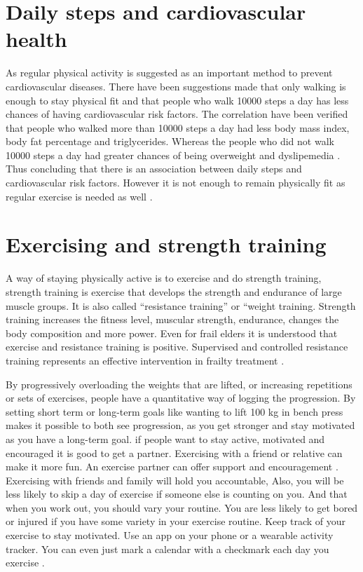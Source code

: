\section{Daily steps and cardiovascular health}
As regular physical activity is suggested as an important method to prevent cardiovascular diseases. There have been suggestions made that only walking is enough to stay physical fit and that people who walk 10000 steps a day has less chances of having cardiovascular risk factors. The correlation have been verified that people who walked more than 10000 steps a day had less body mass index, body fat percentage and triglycerides. Whereas the people who did not walk 10000 steps a day had greater chances of being overweight and dyslipemedia \cite{Rodrigues}. Thus concluding that there is an association between daily steps and cardiovascular risk factors. However it is not enough to remain physically fit as regular exercise is needed as well \cite{WHO}.

\section{Exercising and strength training}
A way of staying physically active is to exercise and do strength training, strength training is exercise that develops the strength and endurance of large muscle groups. It is also called “resistance training” or “weight training\cite{Resistance}. Strength training increases the fitness level, muscular strength, endurance, changes the body composition and more power. Even for frail elders it is understood that exercise and resistance training is positive. Supervised and controlled resistance training represents an effective intervention in frailty treatment \cite{Lopesz}.

By progressively overloading the weights that are lifted, or increasing repetitions or sets of exercises, people have a quantitative way of logging the progression. By setting short term or long-term goals like wanting to lift 100 kg in bench press makes it possible to both see progression, as you get stronger and stay motivated as you have a long-term goal.
if people want to stay active, motivated and encouraged it is good to get a partner. Exercising with a friend or relative can make it more fun. An exercise partner can offer support and encouragement \cite{FriendWorkout}. Exercising with friends and family will hold you accountable, Also, you will be less likely to skip a day of exercise if someone else is counting on you. And that when you work out, you should vary your routine. You are less likely to get bored or injured if you have some variety in your exercise routine. Keep track of your exercise to stay motivated. Use an app on your phone or a wearable activity tracker. You can even just mark a calendar with a checkmark each day you exercise \cite{FriendWorkout}.
